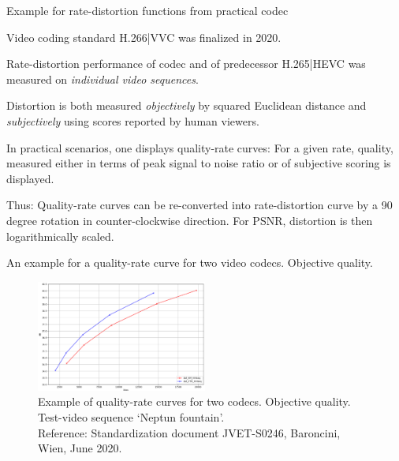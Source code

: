 \begin{frame}{Example for rate-distortion functions from practical codec}
\bit
\item Video coding standard H.266|VVC was finalized in 2020.
\item Rate-distortion performance of codec and of predecessor H.265|HEVC was measured on \textit{individual video sequences}.
\item Distortion is both measured \textit{objectively} by squared Euclidean distance and \textit{subjectively} using scores reported by human viewers. 
\item In practical scenarios, one displays quality-rate curves: For a given rate, quality, measured either in terms of peak signal to noise ratio or of subjective scoring is displayed.
\item Thus: Quality-rate curves can be re-converted into rate-distortion curve by a 90 degree rotation in counter-clockwise direction. For PSNR, distortion 
is then logarithmically scaled. 
\eit
\end{frame}


\begin{frame}{An example for a quality-rate curve for two video codecs. Objective quality.}
\begin{figure}
\centering
\includegraphics[width=0.50\textwidth]{RD_IV/Neptun_Obj_Ausschnitt.png}
\captionsetup{labelformat=empty}
\caption{Example of quality-rate curves for two codecs. Objective quality. Test-video sequence `Neptun fountain'.
\\
Reference: Standardization document  JVET-S0246, Baroncini, Wien, June 2020. 
}
\end{figure}
\end{frame}




